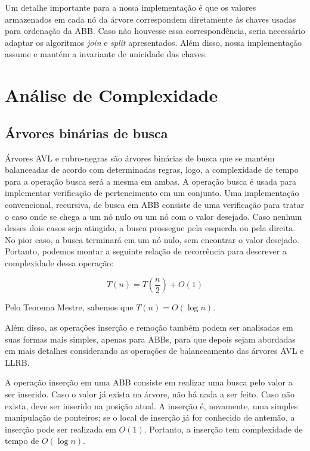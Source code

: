 \documentclass[a4paper,12pt]{report}
\begin{document}
Um detalhe importante para a nossa implementação é que os valores armazenados
em cada nó da árvore correspondem diretamente às chaves usadas para ordenação
da ABB. Caso não houvesse essa correspondência, seria necessário adaptar os
algoritmos \textit{join} e \textit{split} apresentados. Além disso, nossa 
implementação assume e mantém a invariante de unicidade das chaves.

\section*{Análise de Complexidade}

\subsection*{Árvores binárias de busca}

Árvores AVL e rubro-negras são árvores binárias de busca que se mantém 
balanceadas de acordo com determinadas regras, logo, a complexidade
de tempo para a operação busca será a mesma em ambas. A operação busca é
usada para implementar verificação de pertencimento em um conjunto. Uma 
implementação convencional, recursiva, de busca em ABB consiste de uma
verificação para tratar o caso onde se chega a um nó nulo ou um nó com o valor
desejado. Caso nenhum desses dois casos seja atingido, a busca prossegue pela
esquerda ou pela direita. No pior caso, a busca terminará em um nó nulo, sem
encontrar o valor desejado. Portanto, podemos montar a seguinte relação de 
recorrência para descrever a complexidade dessa operação:

\[
                      T(n) = T\left(\frac{n}{2}\right) + O(1)
\]

Pelo Teorema Mestre, sabemos que $T(n) = O(\log n)$.

Além disso, as operações inserção e remoção também podem ser analisadas em suas
formas mais simples, apenas para ABBs, para que depois sejam abordadas em mais
detalhes considerando as operações de balanceamento das árvores AVL e LLRB.

A operação inserção em uma ABB consiste em realizar uma busca pelo valor a ser
inserido. Caso o valor já exista na árvore, não há nada a ser feito. Caso não 
exista, deve ser inserido na posição atual. A inserção é, novamente, uma simples
manipulação de ponteiros; se o local de inserção já for conhecido de antemão,
a inserção pode ser realizada em $O(1)$. Portanto, a inserção tem complexidade
de tempo de $O(\log n)$.
\end{document}
